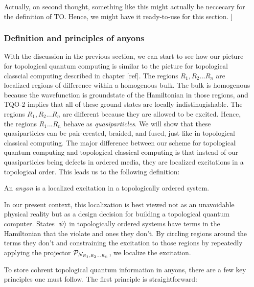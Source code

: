 Actually, on second thought, something like this might actually be neccecary for the definition of TO. Hence, we might have it ready-to-use for this section.
]


\subsubsection{Definition and principles of anyons}

With the discussion in the previous section, we can start to see how our picture for topological quantum computing is similar to the picture for topological classcial computing described in chapter [ref]. The regions $R_1,R_2... R_n$ are localized regions of difference within a homogenous bulk. The bulk is homogenous because the wavefunction is groundstate of the Hamiltonian in those regions, and TQO-2 implies that all of these ground states are locally indistinugishable. The regions $R_1,R_2... R_n$ are different because they are allowed to be excited. Hence, the regions $R_1... R_n$ behave as \textit{quasiparticles}. We will show that these quasiparticles can be pair-created, braided, and fused, just like in topological classical computing. The major difference between our scheme for topological quantum computing and topological classical computing is that instead of our quasiparticles being defects in ordered media, they are localized excitations in a topological order. This leads us to the following definition:

\begin{definition} An \textit{anyon} is a localized excitation in a topologically ordered system.
\end{definition}

In our present context, this localization is best viewed not as an unavoidable physical reality but as a design decision for building a topological quantum computer. States $\ket{\psi}$ in topologically ordered systems have terms in the Hamiltonian that the violate and ones they don't. By circling regions around the terms they don't and constraining the excitation to those regions by repeatedly applying the projector $\mathcal{P}_{\mathcal{N}_{R_1,R_2... R_n}}$, we localize the excitation.

To store cohrent topological quantum information in anyons, there are a few key principles one must follow. The first principle is straightforward:

\begin{center}
\end{center}

